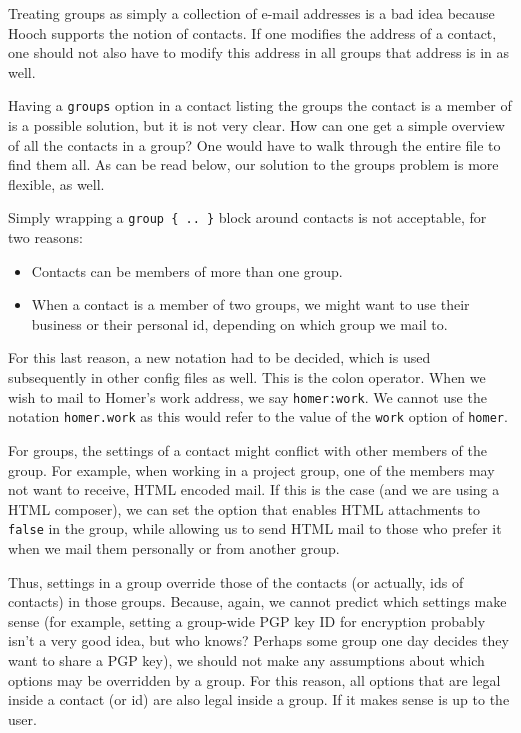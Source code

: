 \documentclass[a4paper]{article}
\begin{document}
Treating groups as simply a collection of e-mail addresses is a bad idea
because Hooch supports the notion of contacts.  If one modifies the
address of a contact, one should not also have to modify this address in
all groups that address is in as well.

Having a \texttt{groups} option in a contact listing the groups the
contact is a member of is a possible solution, but it is not very clear.
How can one get a simple overview of all the contacts in a group?  One would
have to walk through the entire file to find them all.  As can be read
below, our solution to the groups problem is more flexible, as well.

Simply wrapping a \texttt{group \{ .. \}} block around contacts is not
acceptable, for two reasons:
\begin{itemize}
\item Contacts can be members of more than one group.
\item When a contact is a member of two groups, we might want to use
	their business or their personal id, depending on which group we
	mail to.
\end{itemize}
For this last reason, a new notation had to be decided, which is used
subsequently in other config files as well.  This is the colon
operator.  When we wish to mail to Homer's work address, we say
\texttt{homer:work}.  We cannot use the notation \texttt{homer.work} as
this would refer to the value of the \texttt{work} option of \texttt{homer}.

For groups, the settings of a contact might conflict with other members
of the group.  For example, when working in a project group, one of the
members may not want to receive, HTML encoded mail.  If this is the
case (and we are using a HTML composer), we can set the option that
enables HTML attachments to \texttt{false} in the group, while allowing
us to send HTML mail to those who prefer it when we mail them personally
or from another group.

Thus, settings in a group override those of the contacts (or actually,
ids of contacts) in those groups.  Because, again, we cannot predict
which settings make sense (for example, setting a group-wide PGP key ID for
encryption probably isn't a very good idea, but who knows?  Perhaps some
group one day decides they want to share a PGP key), we should not make any
assumptions about which options may be overridden by a group.
For this reason, all options that are legal inside a contact (or id) are
also legal inside a group.  If it makes sense is up to the user.
\end{document}
